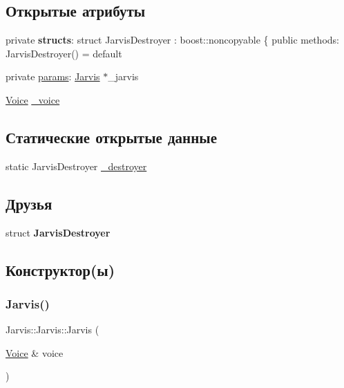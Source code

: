 \subsection*{Открытые атрибуты}
\begin{DoxyCompactItemize}
\item 
\mbox{\label{classJarvis_1_1Jarvis_a8f581526d8e72ff7a086ea054008ad45}} 
private {\bfseries structs}\+: struct Jarvis\+Destroyer \+: boost\+::noncopyable \{ public methods\+: Jarvis\+Destroyer() = default
\item 
private \hyperlink{classJarvis_1_1Jarvis_a4009b6177d6dd3b01d550ba8d628b0ed}{params}\+: \hyperlink{classJarvis_1_1Jarvis}{Jarvis} $\ast$\+\_\+jarvis
\item 
\hyperlink{classJarvis_1_1Voice}{Voice} \hyperlink{classJarvis_1_1Jarvis_a52effab3870e7ba14e5a1fdbd5d2edc1}{\+\_\+voice}
\end{DoxyCompactItemize}
\subsection*{Статические открытые данные}
\begin{DoxyCompactItemize}
\item 
static Jarvis\+Destroyer \hyperlink{classJarvis_1_1Jarvis_ab2ccf0fd1be13af518d79c8c3adb2042}{\+\_\+destroyer}
\end{DoxyCompactItemize}
\subsection*{Друзья}
\begin{DoxyCompactItemize}
\item 
\mbox{\label{classJarvis_1_1Jarvis_a2cc2b1b8510e686a8d6d42aeee07448d}} 
struct {\bfseries Jarvis\+Destroyer}
\end{DoxyCompactItemize}


\subsection{Конструктор(ы)}
\mbox{\label{classJarvis_1_1Jarvis_ae6a7cc649ef8aabd836c8b549ab39507}} 
\subsubsection{\texorpdfstring{Jarvis()}{Jarvis()}}
{\footnotesize\ttfamily Jarvis\+::\+Jarvis\+::\+Jarvis (\begin{DoxyParamCaption}\item[{\hyperlink{classJarvis_1_1Voice}{Voice} \&}]{voice }\end{DoxyParamCaption})}



